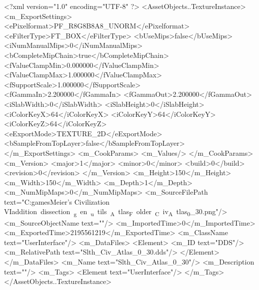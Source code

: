<?xml version="1.0" encoding="UTF-8" ?>
<AssetObjects..TextureInstance>
	<m_ExportSettings>
		<ePixelformat>PF_R8G8B8A8_UNORM</ePixelformat>
		<eFilterType>FT_BOX</eFilterType>
		<bUseMips>false</bUseMips>
		<iNumManualMips>0</iNumManualMips>
		<bCompleteMipChain>true</bCompleteMipChain>
		<fValueClampMin>0.000000</fValueClampMin>
		<fValueClampMax>1.000000</fValueClampMax>
		<fSupportScale>1.000000</fSupportScale>
		<fGammaIn>2.200000</fGammaIn>
		<fGammaOut>2.200000</fGammaOut>
		<iSlabWidth>0</iSlabWidth>
		<iSlabHeight>0</iSlabHeight>
		<iColorKeyX>64</iColorKeyX>
		<iColorKeyY>64</iColorKeyY>
		<iColorKeyZ>64</iColorKeyZ>
		<eExportMode>TEXTURE_2D</eExportMode>
		<bSampleFromTopLayer>false</bSampleFromTopLayer>
	</m_ExportSettings>
	<m_CookParams>
		<m_Values/>
	</m_CookParams>
	<m_Version>
		<major>1</major>
		<minor>0</minor>
		<build>0</build>
		<revision>0</revision>
	</m_Version>
	<m_Height>150</m_Height>
	<m_Width>150</m_Width>
	<m_Depth>1</m_Depth>
	<m_NumMipMaps>0</m_NumMipMaps>
	<m_SourceFilePath text="C:\Users\Sam\Documents\my games\Sid Meier's Civilization VI\Mods\unit addition dissection\python_gen\build_utils\CIV_Atlas_Folder\Slth_Civ_Atlas_0_30.png"/>
	<m_SourceObjectName text=""/>
	<m_ImportedTime>0</m_ImportedTime>
	<m_ExportedTime>2195561219</m_ExportedTime>
	<m_ClassName text="UserInterface"/>
	<m_DataFiles>
		<Element>
			<m_ID text="DDS"/>
			<m_RelativePath text="Slth_Civ_Atlas_0_30.dds"/>
		</Element>
	</m_DataFiles>
	<m_Name text="Slth_Civ_Atlas_0_30"/>
	<m_Description text=""/>
	<m_Tags>
		<Element text="UserInterface"/>
	</m_Tags>
</AssetObjects..TextureInstance>

